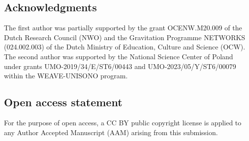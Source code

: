 \documentclass[11pt,a4paper]{article}
\theoremstyle{definition}
\begin{document}
\subsection*{Acknowledgments}
The first author was partially supported by the grant OCENW.M20.009 of the Dutch Research Council (NWO) and the Gravitation Programme NETWORKS (024.002.003) of the Dutch Ministry of Education, Culture and Science (OCW).
The second author was supported by the National Science Center of Poland under grants 
UMO-2019/34/E/ST6/00443 and UMO-2023/05/Y/ST6/00079 within the WEAVE-UNISONO program.


\subsection*{Open access statement}
For the purpose of open access, a CC BY public copyright license is applied to any Author Accepted Manuscript (AAM) arising from this submission.

\nocite{*}


\end{document}
